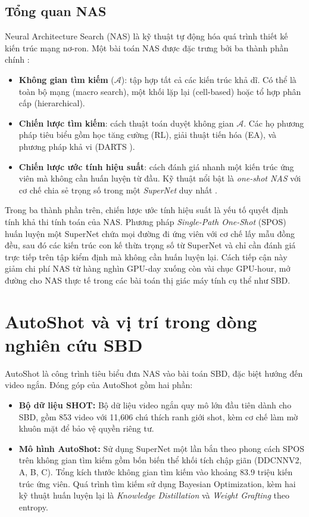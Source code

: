 \subsection{Tổng quan NAS}
Neural Architecture Search (NAS) là kỹ thuật tự động hóa quá trình thiết kế kiến trúc mạng nơ-ron. Một bài toán NAS được đặc trưng bởi ba thành phần chính \cite{elsken2018_nas_survey}:
\begin{itemize}
    \item \textbf{Không gian tìm kiếm} ($\mathcal{A}$): tập hợp tất cả các kiến trúc khả dĩ. Có thể là toàn bộ mạng (macro search), một khối lặp lại (cell-based) hoặc tổ hợp phân cấp (hierarchical).
    \item \textbf{Chiến lược tìm kiếm}: cách thuật toán duyệt không gian $\mathcal{A}$. Các họ phương pháp tiêu biểu gồm học tăng cường (RL), giải thuật tiến hóa (EA), và phương pháp khả vi (DARTS \cite{liu2019darts}).
    \item \textbf{Chiến lược ước tính hiệu suất}: cách đánh giá nhanh một kiến trúc ứng viên mà không cần huấn luyện từ đầu. Kỹ thuật nổi bật là \textit{one-shot NAS} với cơ chế chia sẻ trọng số trong một \textit{SuperNet} duy nhất \cite{guo2020spos}.
\end{itemize}

Trong ba thành phần trên, chiến lược ước tính hiệu suất là yếu tố quyết định tính khả thi tính toán của NAS. Phương pháp \textit{Single-Path One-Shot} (SPOS) \cite{guo2020spos} huấn luyện một SuperNet chứa mọi đường đi ứng viên với cơ chế lấy mẫu đồng đều, sau đó các kiến trúc con kế thừa trọng số từ SuperNet và chỉ cần đánh giá trực tiếp trên tập kiểm định mà không cần huấn luyện lại. Cách tiếp cận này giảm chi phí NAS từ hàng nghìn GPU-day xuống còn vài chục GPU-hour, mở đường cho NAS thực tế trong các bài toán thị giác máy tính cụ thể như SBD.

\section{AutoShot và vị trí trong dòng nghiên cứu SBD}
AutoShot \cite{zhu2023autoshot} là công trình tiêu biểu đưa NAS vào bài toán SBD, đặc biệt hướng đến video ngắn. Đóng góp của AutoShot gồm hai phần:
\begin{itemize}
    \item \textbf{Bộ dữ liệu SHOT:} Bộ dữ liệu video ngắn quy mô lớn đầu tiên dành cho SBD, gồm 853 video với 11{,}606 chú thích ranh giới shot, kèm cơ chế làm mờ khuôn mặt để bảo vệ quyền riêng tư.
    \item \textbf{Mô hình AutoShot:} Sử dụng SuperNet một lần bắn theo phong cách SPOS \cite{guo2020spos} trên không gian tìm kiếm gồm bốn biến thể khối tích chập giãn (DDCNNV2, A, B, C). Tổng kích thước không gian tìm kiếm vào khoảng 83.9 triệu kiến trúc ứng viên. Quá trình tìm kiếm sử dụng Bayesian Optimization, kèm hai kỹ thuật huấn luyện lại là \textit{Knowledge Distillation} \cite{hinton2015distilling} và \textit{Weight Grafting} theo entropy.
\end{itemize}

